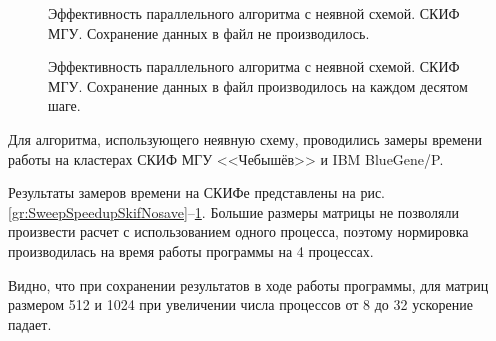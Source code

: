     \begin{figure}[h!]
        \begin{center}
            \begin{minipage}{0.45\linewidth}
                \caption{Эффективность параллельного алгоритма с неявной схемой. СКИФ МГУ. Сохранение данных в файл не производилось.}
                \label{gr:SweepEfficiencySkifNosave}
			\end{minipage}
			\hfill
			\begin{minipage}{0.45\linewidth}
                \caption{Эффективность параллельного алгоритма с неявной схемой. СКИФ МГУ. Сохранение данных в файл производилось на каждом десятом шаге.}
                \label{gr:SweepEfficiencySkifSave}
			\end{minipage}
		\end{center}
	\end{figure}

Для алгоритма, использующего неявную схему, проводились замеры времени работы на кластерах СКИФ МГУ <<Чебышёв>> и IBM BlueGene/P.

Результаты замеров времени на СКИФе представлены на рис. \ref{gr:SweepSpeedupSkifNosave}--\ref{gr:SweepEfficiencySkifSave}.
Большие размеры матрицы не позволяли произвести расчет с использованием одного процесса, поэтому нормировка производилась на время работы программы на 4 процессах.

Видно, что при сохранении результатов в ходе работы программы, для матриц размером 512 и 1024 при увеличении числа процессов от 8 до 32 ускорение падает.

